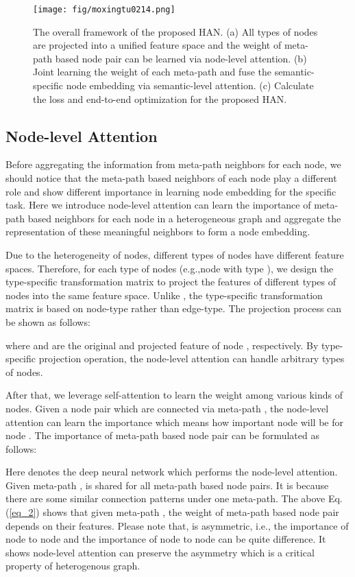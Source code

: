 \begin{figure}
\centering
	\texttt{[image: fig/moxingtu0214.png]}
\caption{The overall framework of the proposed HAN. (a) All types of nodes are projected into a unified feature space and the weight of meta-path based node pair can be learned via node-level attention.  (b) Joint learning the weight of each meta-path and fuse the semantic-specific node embedding via
		semantic-level attention. 
		(c) Calculate the loss and end-to-end optimization for the proposed HAN.
	}
	\label{liuchengtu}
\end{figure}



\subsection{Node-level Attention}
Before aggregating the information from meta-path neighbors for each node, we should notice that the meta-path based neighbors of each node play a different role and show different importance in learning node embedding for the specific task.
Here we introduce node-level attention can learn the importance of meta-path based neighbors for each node in a heterogeneous graph and aggregate the representation of these meaningful neighbors to form a node embedding.



Due to the heterogeneity of nodes, different types of nodes have different feature spaces.
Therefore, for each type of nodes (e.g.,node with type ), we design the type-specific transformation matrix   to project 
the features of different types of nodes into the same feature space. Unlike \cite{hamilton2018embedding}, the type-specific transformation matrix  is based on node-type rather than edge-type. The projection process can be shown as follows:

where   and  are the original and projected feature of node , respectively. By type-specific projection operation, the node-level attention can handle arbitrary types of nodes.


After that, we leverage self-attention  \cite{attisallyouneed} to learn the weight among various 
kinds of nodes. 
Given a node pair  which are connected via meta-path ,
the node-level attention  can learn the importance  which means how important node  will be for node . The importance of meta-path based node pair  can be formulated as follows:

Here  denotes the deep neural network which performs the node-level attention. Given meta-path ,  is shared for all meta-path based node pairs. It is because there are some similar connection patterns under one meta-path. The above Eq. (\ref{eq_2}) shows that given meta-path , the weight of meta-path based node pair  depends on their features.
Please note that,  is asymmetric, i.e., the importance of node  to node  and the importance of node  to node  can be quite difference. It shows node-level attention can preserve the asymmetry which is a critical property of heterogenous graph.

